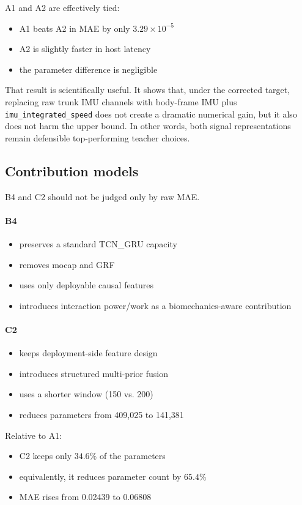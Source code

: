 \documentclass[11pt,a4paper]{article}
\begin{document}
A1 and A2 are effectively tied:
\begin{itemize}
\item A1 beats A2 in MAE by only \(3.29 \times 10^{-5}\)
\item A2 is slightly faster in host latency
\item the parameter difference is negligible
\end{itemize}

That result is scientifically useful.
It shows that, under the corrected target, replacing raw trunk IMU channels with body-frame IMU plus \texttt{imu\_integrated\_speed} does not create a dramatic numerical gain, but it also does not harm the upper bound.
In other words, both signal representations remain defensible top-performing teacher choices.

\subsection{Contribution models}

B4 and C2 should not be judged only by raw MAE.

\paragraph{B4}
\begin{itemize}
\item preserves a standard TCN\_GRU capacity
\item removes mocap and GRF
\item uses only deployable causal features
\item introduces interaction power/work as a biomechanics-aware contribution
\end{itemize}

\paragraph{C2}
\begin{itemize}
\item keeps deployment-side feature design
\item introduces structured multi-prior fusion
\item uses a shorter window (150 vs. 200)
\item reduces parameters from 409,025 to 141,381
\end{itemize}

Relative to A1:
\begin{itemize}
\item C2 keeps only \(34.6\%\) of the parameters
\item equivalently, it reduces parameter count by \(65.4\%\)
\item MAE rises from 0.02439 to 0.06808
\end{itemize}
\end{document}
